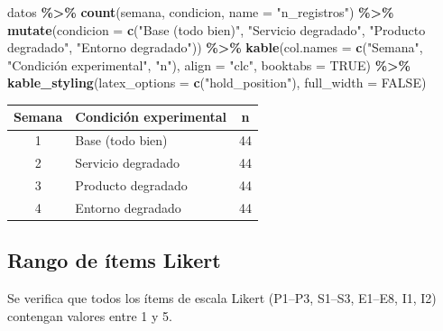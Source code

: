 \documentclass[
  spanish,
]{article}
\newenvironment{Shaded}{\begin{snugshade}}{\end{snugshade}}
\newcommand{\AttributeTok}[1]{\textcolor[rgb]{0.13,0.29,0.53}{#1}}
\newcommand{\ConstantTok}[1]{\textcolor[rgb]{0.56,0.35,0.01}{#1}}
\newcommand{\FunctionTok}[1]{\textcolor[rgb]{0.13,0.29,0.53}{\textbf{#1}}}
\newcommand{\NormalTok}[1]{#1}
\newcommand{\SpecialCharTok}[1]{\textcolor[rgb]{0.81,0.36,0.00}{\textbf{#1}}}
\newcommand{\StringTok}[1]{\textcolor[rgb]{0.31,0.60,0.02}{#1}}
\begin{document}
\begin{Shaded}
\begin{Highlighting}[]
\NormalTok{datos }\SpecialCharTok{\%\textgreater{}\%}
  \FunctionTok{count}\NormalTok{(semana, condicion, }\AttributeTok{name =} \StringTok{"n\_registros"}\NormalTok{) }\SpecialCharTok{\%\textgreater{}\%}
  \FunctionTok{mutate}\NormalTok{(}\AttributeTok{condicion =} \FunctionTok{c}\NormalTok{(}\StringTok{"Base (todo bien)"}\NormalTok{,}
                        \StringTok{"Servicio degradado"}\NormalTok{,}
                        \StringTok{"Producto degradado"}\NormalTok{,}
                        \StringTok{"Entorno degradado"}\NormalTok{)) }\SpecialCharTok{\%\textgreater{}\%}
  \FunctionTok{kable}\NormalTok{(}\AttributeTok{col.names =} \FunctionTok{c}\NormalTok{(}\StringTok{"Semana"}\NormalTok{, }\StringTok{"Condición experimental"}\NormalTok{, }\StringTok{"n"}\NormalTok{),}
        \AttributeTok{align    =} \StringTok{"clc"}\NormalTok{,}
        \AttributeTok{booktabs =} \ConstantTok{TRUE}\NormalTok{) }\SpecialCharTok{\%\textgreater{}\%}
  \FunctionTok{kable\_styling}\NormalTok{(}\AttributeTok{latex\_options =} \FunctionTok{c}\NormalTok{(}\StringTok{"hold\_position"}\NormalTok{),}
                \AttributeTok{full\_width =} \ConstantTok{FALSE}\NormalTok{)}
\end{Highlighting}
\end{Shaded}

\begin{table}[!h]
\centering
\begin{tabular}{clc}
\toprule
Semana & Condición experimental & n\\
\midrule
1 & Base (todo bien) & 44\\
2 & Servicio degradado & 44\\
3 & Producto degradado & 44\\
4 & Entorno degradado & 44\\
\bottomrule
\end{tabular}
\end{table}

\subsection{Rango de ítems Likert}\label{rango-de-uxedtems-likert}

Se verifica que todos los ítems de escala Likert (P1--P3, S1--S3,
E1--E8, I1, I2) contengan valores entre 1 y 5.
\end{document}
